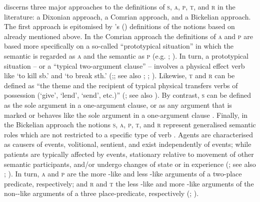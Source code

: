\largerpage
\citet{haspelmath:2011a} discerns three major approaches to the definitions of \textsc{s}, \textsc{a}, \textsc{p}, \textsc{t}, and \textsc{r} in the literature: a Dixonian approach, a Comrian approach, and a Bickelian approach. The first approach is epitomised by \citeauthor{dixon:1972}’s (\citeyear{dixon:1972, dixon:1979, dixon:1994, dixon:2010a, dixon:2010b}) definitions of the notions based on  already mentioned above. In the Comrian approach the definitions of \textsc{a} and \textsc{p} are based more specifically on a so-called “prototypical  situation” in which the semantic  is regarded as \textsc{a} and the semantic  as \textsc{p} (e.g. \citealt[105]{comrie:1981}; \citeyear[11]{comrie:1989}). In turn, a prototypical  situation -- or a “typical two-argument clause” -- involves a physical effect verb like ‘to kill sb.’ and ‘to break sth.’ (\citealt[545ff.]{haspelmath:2011a};; see also \citealt{andrews:1985, andrews:2007}; \citealt{lazard:2002}; \citealt{creissels:2006}). Likewise, \textsc{t} and \textsc{r} can be defined as “the theme and the recipient of typical physical transfers verbs of possession (‘give’, ‘lend’, ‘send’, etc.)” (\citealt[558]{haspelmath:2011a}; see also \citealt{malchukov:al:2010}). By contrast, \textsc{s} can be defined as the sole argument in a one-argument clause, or as any argument that is marked or behaves like the sole argument in a one-argument clause \citep[549f.]{haspelmath:2011a}. Finally, in the Bickelian approach the notions \textsc{s}, \textsc{a}, \textsc{p}, \textsc{t}, and \textsc{r} represent generalised semantic roles which are not restricted to a specific type of verb \citep{nichols:2008, bickel:nichols:2009, bickel:al:2010, bickel:2011, witzlack-makarevich:2011}. Agents are characterised as causers of events, volitional, sentient, and exist independently of events; while patients are typically affected by events, stationary relative to movement of other semantic participants, and/or undergo changes of state or in experience (\citealt[554]{haspelmath:2011a}; see also \citealt{dowty:1991}; \citealt[384]{bickel:al:2010}). In turn, \textsc{a} and \textsc{p} are the more -like and less -like arguments of a two-place predicate, respectively; and \textsc{r} and \textsc{t} the less -like and more -like arguments of the non--like arguments of a three place-predicate, respectively (\citealt[307]{bickel:nichols:2009}; \citealt[384]{bickel:al:2010}). 

